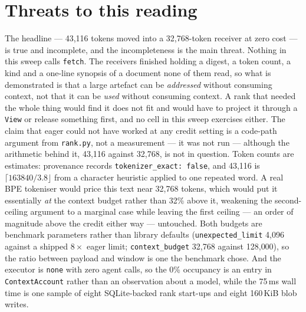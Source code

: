 \documentclass[11pt]{article}
\begin{document}
\section{Threats to this reading}

The headline --- 43{,}116 tokens moved into a 32{,}768-token receiver at zero cost ---
is true and incomplete, and the incompleteness is the main threat. Nothing in this
sweep calls \texttt{fetch}. The receivers finished holding a digest, a token count, a
kind and a one-line synopsis of a document none of them read, so what is demonstrated
is that a large artefact can be \emph{addressed} without consuming context, not that
it can be \emph{used} without consuming context. A rank that needed the whole thing
would find it does not fit and would have to project it through a \texttt{View} or
release something first, and no cell in this sweep exercises either. The claim that
eager could not have worked at any credit setting is a code-path argument from
\texttt{rank.py}, not a measurement --- it was not run --- although the arithmetic
behind it, 43{,}116 against 32{,}768, is not in question. Token counts are estimates:
provenance records \texttt{tokenizer\_exact: false}, and 43{,}116 is
$\lceil 163840/3.8 \rfloor$ from a character heuristic applied to one repeated word.
A real BPE tokeniser would price this text near 32{,}768 tokens, which would put it
essentially \emph{at} the context budget rather than 32\% above it, weakening the
second-ceiling argument to a marginal case while leaving the first ceiling --- an
order of magnitude above the credit either way --- untouched. Both budgets are
benchmark parameters rather than library defaults (\texttt{unexpected\_limit} 4{,}096
against a shipped $8\times$ eager limit; \texttt{context\_budget} 32{,}768 against
128{,}000), so the ratio between payload and window is one the benchmark chose. And
the executor is \texttt{none} with zero agent calls, so the 0\% occupancy is an entry
in \texttt{ContextAccount} rather than an observation about a model, while the 75\,ms
wall time is one sample of eight SQLite-backed rank start-ups and eight 160\,KiB blob
writes.
\end{document}
